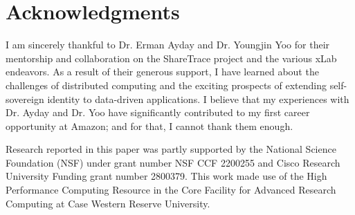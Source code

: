 \section*{Acknowledgments}
I am sincerely thankful to Dr. Erman Ayday and Dr. Youngjin Yoo for their mentorship and collaboration on the ShareTrace project and the various xLab endeavors. As a result of their generous support, I have learned about the challenges of distributed computing and the exciting prospects of extending self-sovereign identity to data-driven applications. I believe that my experiences with Dr. Ayday and Dr. Yoo have significantly contributed to my first career opportunity at Amazon; and for that, I cannot thank them enough.

Research reported in this paper was partly supported by the National Science Foundation (NSF) under grant number NSF CCF 2200255 and Cisco Research University Funding grant number 2800379. This work made use of the High Performance Computing Resource in the Core Facility for Advanced Research Computing at Case Western Reserve University.
\clearpage